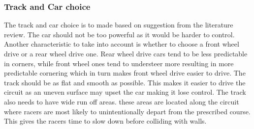 \subsubsection{Track and Car choice}
The track and car choice is to made based on suggestion from the literature review. The car should not be too powerful as it would be harder to control. Another characteristic to take into account is whether to choose a front wheel drive or a rear wheel drive one. Rear wheel drive cars tend to be less predictable in corners, while front wheel ones tend to understeer more resulting in more predictable cornering which in turn makes front wheel drive easier to drive. The track should be as flat and smooth as possible. This makes it easier to drive the circuit as an uneven surface may upset the car making it lose control. The track also needs to have wide run off areas. these areas are located along the circuit where racers are most likely to unintentionally depart from the prescribed course. This gives the racers time to slow down before colliding with walls.

